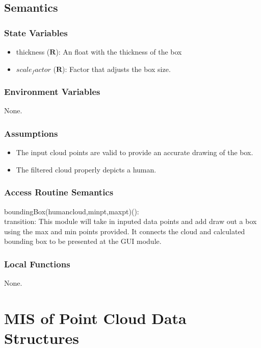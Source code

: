 \documentclass[12pt, titlepage]{article}
\begin{document}
\subsection{Semantics}

\subsubsection{State Variables}

\begin{itemize}
  \item thickness ($\mathbf{R}$): An float with the thickness of the box
  \item $scale_factor$ ($\mathbf{R}$): Factor that adjusts the box size.
\end{itemize}

\subsubsection{Environment Variables}

None.

\subsubsection{Assumptions}

\begin{itemize}
  \item The input cloud points are valid to provide an accurate drawing of the box.
  \item The filtered cloud properly depicts a human.
\end{itemize}

\subsubsection{Access Routine Semantics}

\noindent boundingBox(humancloud,minpt,maxpt)():\\
transition: This module will take in inputed data points and add draw out a box using the max and min points provided. 
It connects the cloud and calculated bounding box to be presented at the GUI module.
\subsubsection{Local Functions}

None.
\newpage

\section{MIS of Point Cloud Data Structures} \label{ModulePCDS} 
\end{document}
